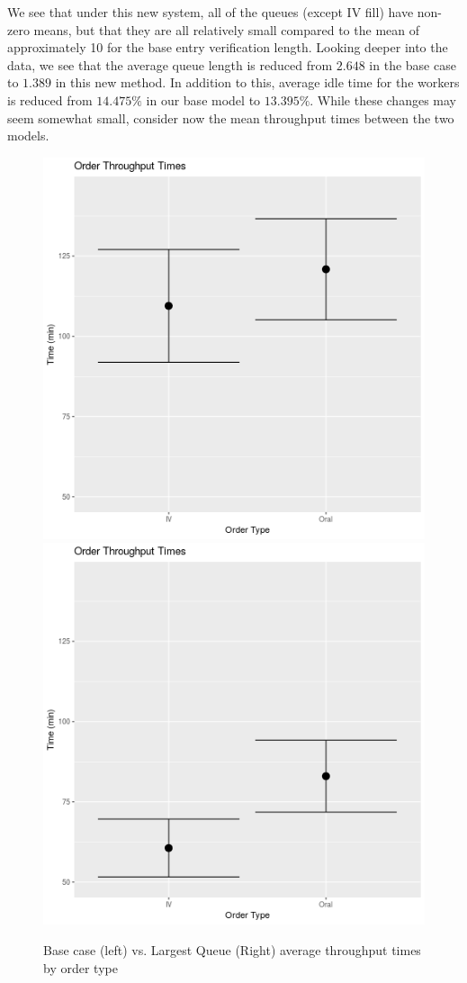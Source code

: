 \documentclass[10pt]{report}            %
\begin{document}
We see that under this new system, all of the queues (except IV fill) have non-zero means, but that they are all relatively small compared to the mean of approximately 10 for the base entry verification length. Looking deeper into the data, we see that the average queue length is reduced from $2.648$ in the base case to $1.389$ in this new method. In addition to this, average idle time for the workers is reduced from $14.475\%$ in our base model to $13.395\%$. While these changes may seem somewhat small, consider now the mean throughput times between the two models.
\begin{figure}[H]
\centering
\includegraphics[scale=.35]{BaseThroughputCIs.png}
\includegraphics[scale=.35]{LongestThroughputCIs.png}
\caption{Base case (left) vs. Largest Queue (Right) average throughput times by order type}
\label{fig:basevlongthrough}
\end{figure}
\end{document}
